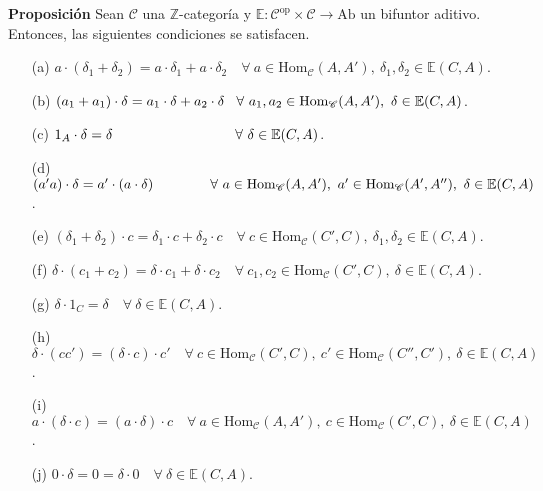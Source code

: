 \documentclass[preview]{standalone}
\begin{document}
\begin{center}
\justifying \textbf{Proposición} Sean $\mathscr{C}$ una $\mathbb{Z}$-categoría y $\mathbb{E}:\mathscr{C}^\text{op}\times\mathscr{C}\to\text{Ab}$ un bifuntor aditivo. Entonces, las siguientes condiciones se satisfacen. \begin{enumerate} \item[(a)] $a\cdot(\delta_1+\delta_2) = a\cdot\delta_1 + a\cdot\delta_2 \quad \forall \ a\in\text{Hom}_\mathscr{C}(A,A'), \ \delta_1,\delta_2\in\mathbb{E}(C,A)$. \item[(b)] $(a_1+a_1)\cdot\delta = a_1\cdot\delta + a_2\cdot\delta \quad \hspace{-0.5mm} \forall \ a_1,a_2\in\text{Hom}_\mathscr{C}(A,A'), \ \delta\in\mathbb{E}(C,A)$. \item[(c)] $1_A\cdot\delta = \delta \hspace{3.1cm} \forall \ \delta\in\mathbb{E}(C,A)$. \item[(d)] $(a'a)\cdot\delta = a'\cdot(a\cdot\delta) \hspace{1.45cm} \forall \ a\in\text{Hom}_\mathscr{C}(A,A'), \ a'\in\text{Hom}_\mathscr{C}(A',A''), \ \delta\in\mathbb{E}(C,A)$. \item[(e)] $(\delta_1+\delta_2)\cdot c = \delta_1\cdot c + \delta_2\cdot c \quad \forall \ c\in\text{Hom}_\mathscr{C}(C',C), \ \delta_1,\delta_2\in\mathbb{E}(C,A)$. \item[(f)] $\delta\cdot(c_1+c_2)=\delta\cdot c_1 + \delta\cdot c_2 \quad \forall \ c_1,c_2\in\text{Hom}_\mathscr{C}(C',C), \ \delta\in\mathbb{E}(C,A)$. \item[(g)] $\delta\cdot1_C  = \delta \quad \forall \ \delta\in\mathbb{E}(C,A)$. \item[(h)] $\delta\cdot(cc') = (\delta\cdot c)\cdot c' \quad \forall \ c\in\text{Hom}_\mathscr{C}(C',C), \ c'\in\text{Hom}_\mathscr{C}(C'',C'), \ \delta\in\mathbb{E}(C,A)$. \item[(i)] $a\cdot(\delta\cdot c) = (a\cdot\delta)\cdot c \quad \forall \ a\in\text{Hom}_\mathscr{C}(A,A'), \ c\in\text{Hom}_\mathscr{C}(C',C), \ \delta\in\mathbb{E}(C,A)$. \item[(j)] $0\cdot\delta = 0 = \delta\cdot0 \quad \forall \ \delta\in\mathbb{E}(C,A)$. \end{enumerate}
\end{center}
\end{document}
